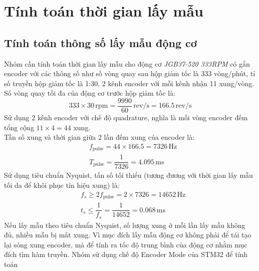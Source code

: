      \section{Tính toán thời gian lấy mẫu}
          \subsection{Tính toán thông số lấy mẫu động cơ}
               \hspace*{0.6cm}Nhóm cần tính toán thời gian lấy mẫu cho động cơ \textit{JGB37-520 333RPM} có gắn encoder với các thông số như số vòng quay sau 
               hộp giảm tốc là 333 vòng/phút, tỉ số truyền hộp giảm tốc là 1:30, 2 kênh encoder với mỗi kênh nhận 11 xung/vòng.\\
               \hspace*{0.6cm}Số vòng quay tối đa của động cơ trước hộp giảm tốc là:
               \begin{equation*}
                    333 \times 30 \,\mathrm{rpm} = \dfrac{9990}{60} \,\mathrm{rev/s} = 166.5 \,\mathrm{rev/s}
               \end{equation*}
               \hspace*{0.6cm}Sử dụng 2 kênh encoder với chế độ quadrature, nghĩa là mỗi vòng encoder đếm tổng cộng $11 \times 4 = 44$ xung.\\
               \hspace*{0.6cm}Tần số xung và thời gian giữa 2 lần đếm xung của encoder là: 
               \begin{align*}
                    &f_{\text{pulse}} = 44 \times 166.5 = 7326 \,\mathrm{Hz}\\
                    &T_{\text{pulse}} = \dfrac{1}{7326} = 4.095 \,\mathrm{ms}
               \end{align*}
               \hspace*{0.6cm}Sử dụng tiêu chuẩn Nyquist, tần số tối thiểu (tương đương với thời gian lấy mẫu tối da để khôi phục tín hiệu xung) là: 
               \begin{align*}
                    &f_s \geq 2 f_{\text{pulse}} = 2 \times 7326 = 14652 \,\mathrm{Hz}\\
                    &t_s \leq \dfrac{1}{f_s} = \dfrac{1}{14652} = 0.068 \,\mathrm{ms}
               \end{align*}
               \hspace*{0.6cm}Nếu lấy mẫu theo tiêu chuẩn Nyquist, số lượng xung ở mỗi lần lấy mẫu không đủ, nhiều mẫu bị mất xung. Vì mục đích lấy mẫu động cơ không phải để tái tạo lại sóng xung encoder, mà để tính ra tốc độ trung bình của động cơ nhằm mục đích tìm hàm truyền. Nhóm sử dụng chế độ Encoder Mode của STM32 để tính toán

